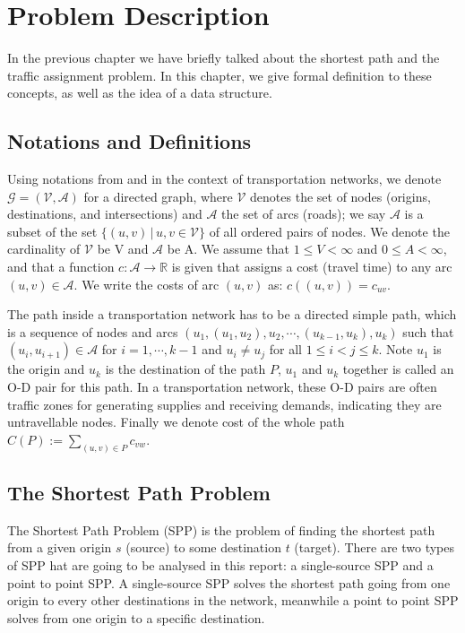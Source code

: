 \chapter{Problem Description}
In the previous chapter we have briefly talked about the
shortest path and the traffic assignment problem.
In this chapter, we give formal definition to these concepts,
as well as the idea of a data structure.
\section{Notations and Definitions}

Using notations from \citep{Klunder} and in the context
of transportation networks,
we denote $ \mathcal{G} = ( \mathcal{V}, \mathcal{A} ) $ for a directed graph,
where $ \mathcal{V} $ denotes the set of nodes (origins, destinations, and intersections)
and $ \mathcal{A} $ the set of arcs (roads);
we say $ \mathcal{A} $ is a subset of the set $ \{ (u, v)\, | \, u, v \in \mathcal{V} \} $ of all ordered pairs of nodes.
We denote the cardinality of $ \mathcal{V} $ be V and $ \mathcal{A} $ be A.
We assume that $ 1 \leq V < \infty $ and $ 0 \leq A < \infty $,
and that a function $ c : \mathcal{A} \rightarrow \mathbb{R} $ is given that assigns a cost (travel time) to any arc $ (u,v) \in \mathcal{A} $.
We write the costs of arc $(u, v)$ as: $ c((u, v)) = c_{uv} $.

The path inside a transportation network has to be a directed simple path, 
which is a sequence of nodes and arcs $ (u_1, (u_1, u_2), u_2, \cdots , (u_{k-1}, u_k), u_k ) $
such that $ (u_i, u_{i+1}) \in \mathcal{A}$ for $i = 1,\cdots,k-1$ and $u_i \neq u_j$ for all $ 1 \leq i < j \leq k$.
Note $u_1$ is the origin and $u_k$ is the destination of the path $P$, $u_1$ and $u_k$ together is called an O-D pair for this path.
In a transportation network,
these O-D pairs are often traffic zones for generating supplies and receiving demands,
indicating they are untravellable nodes.
Finally we denote cost of the whole path $C(P) := \sum_{(u,v)\in P} c_{vw}$.

\section{The Shortest Path Problem}
The Shortest Path Problem (SPP) is the problem of finding the shortest path from a given origin $s$ (source) to some destination $t$ (target).
There are two types of SPP hat are going to
be analysed in this report:
a single-source SPP and a point to point SPP.
A single-source SPP solves the shortest path going from one origin to every other destinations in the network,
meanwhile a point to point SPP solves from one origin to a specific destination.

